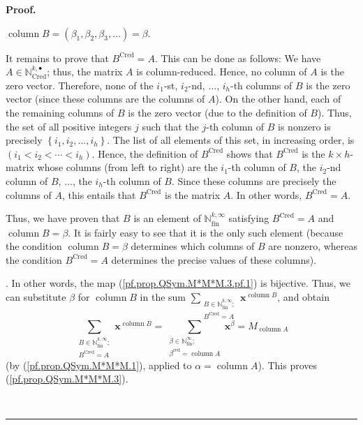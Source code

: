 \documentclass
[numbers=enddot,12pt,final,onecolumn,notitlepage,abstracton]{scrartcl}%
\theoremstyle{definition}
\newenvironment{proof}[1][Proof]{\noindent\textbf{#1.} }{\ \rule{0.5em}{0.5em}}
\let\sumnonlimits\sum
\renewcommand{\sum}{\sumnonlimits\limits}
\begin{document}
\begin{proof}
{$\operatorname*{column}B=\left(  \beta_{1},\beta_{2},\beta_{3},\ldots\right)
=\beta$.
\par
It remains to prove that $B^{\operatorname*{Cred}}=A$. This can be done as
follows: We have $A\in\mathbb{N}_{\operatorname*{Cred}}^{k,\bullet}$; thus,
the matrix $A$ is column-reduced. Hence, no column of $A$ is the zero vector.
Therefore, none of the $i_{1}$-st, $i_{2}$-nd, $\ldots$, $i_{h}$-th columns of
$B$ is the zero vector (since these columns are the columns of $A$). On the
other hand, each of the remaining columns of $B$ is the zero vector (due to
the definition of $B$). Thus, the set of all positive integers $j$ such that
the $j$-th column of $B$ is nonzero is precisely $\left\{  i_{1},i_{2}%
,\ldots,i_{h}\right\}  $. The list of all elements of this set, in increasing
order, is $\left(  i_{1}<i_{2}<\cdots<i_{h}\right)  $. Hence, the definition
of $B^{\operatorname*{Cred}}$ shows that $B^{\operatorname*{Cred}}$ is the
$k\times h$-matrix whose columns (from left to right) are the $i_{1}$-th
column of $B$, the $i_{2}$-nd column of $B$, $\ldots$, the $i_{h}$-th column
of $B$. Since these columns are precisely the columns of $A$, this entails
that $B^{\operatorname*{Cred}}$ is the matrix $A$. In other words,
$B^{\operatorname*{Cred}}=A$.
\par
Thus, we have proven that $B$ is an element of $\mathbb{N}%
_{\operatorname*{fin}}^{k,\infty}$ satisfying $B^{\operatorname*{Cred}}=A$ and
$\operatorname*{column}B=\beta$. It is fairly easy to see that it is the only
such element (because the condition $\operatorname*{column}B=\beta$ determines
which columns of $B$ are nonzero, whereas the condition
$B^{\operatorname*{Cred}}=A$ determines the precise values of these
columns).}. In other words, the map (\ref{pf.prop.QSym.M*M*M.3.pf.1}) is
bijective. Thus, we can substitute $\beta$ for $\operatorname*{column}B$ in
the sum $\sum_{\substack{B\in\mathbb{N}_{\operatorname*{fin}}^{k,\infty
};\\B^{\operatorname*{Cred}}=A}}\mathbf{x}^{\operatorname*{column}B}$, and
obtain%
\[
\sum_{\substack{B\in\mathbb{N}_{\operatorname*{fin}}^{k,\infty}%
;\\B^{\operatorname*{Cred}}=A}}\mathbf{x}^{\operatorname*{column}B}%
=\sum_{\substack{\beta\in\mathbb{N}_{\operatorname*{fin}}^{\infty}%
;\\\beta^{\operatorname*{red}}=\operatorname*{column}A}}\mathbf{x}^{\beta
}=M_{\operatorname*{column}A}%
\]
(by (\ref{pf.prop.QSym.M*M*M.1}), applied to $\alpha=\operatorname*{column}%
A$). This proves (\ref{pf.prop.QSym.M*M*M.3}).


\end{proof}
\end{document}
